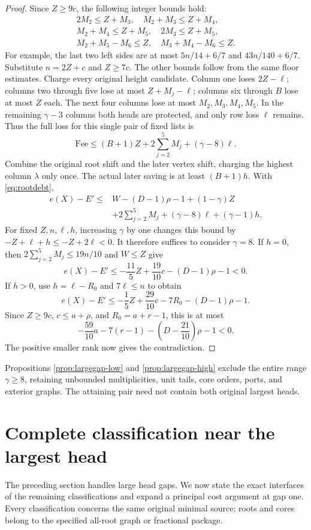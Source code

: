 \documentclass[11pt,a4paper]{article}
\theoremstyle{definition}
\begin{document}
\begin{proof}
Since $Z\ge9c$, the following integer bounds hold:
\[
\begin{gathered}
2M_2\le Z+M_3,\quad M_2+M_3\le Z+M_4,\\
M_2+M_4\le Z+M_5,\quad2M_3\le Z+M_5,\\
M_2+M_5-M_6\le Z,\quad M_3+M_4-M_6\le Z.
\end{gathered}
\]
For example, the last two left sides are at most $5n/14+6/7$ and $43n/140+6/7$. Substitute $n=2Z+c$ and $Z\ge7c$. The other bounds follow from the same floor estimates.
Charge every original height candidate. Column one loses $2Z-\ell$; columns two through five lose at most $Z+M_j-\ell$; columns six through $B$ lose at most $Z$ each. The next four columns lose at most $M_2,M_3,M_4,M_5$. In the remaining $\gamma-3$ columns both heads are protected, and only row loss $\ell$ remains. Thus the full loss for this single pair of fixed lists is
\[
\mathrm{Fee}\le(B+1)Z+2\sum_{j=2}^{5}M_j+(\gamma-8)\ell.
\]
Combine the original root shift and the later vertex shift, charging the highest column $\lambda$ only once. The actual later saving is at least $(B+1)h$. With \eqref{eq:rootdebt},
\[
\begin{split}
e(X)-E' \le{}& W-(D-1)\rho-1+(1-\gamma)Z\\
&+2\sum_{j=2}^{5}M_j+(\gamma-8)\ell+(\gamma-1)h.
\end{split}
\]
For fixed $Z,n,\ell,h$, increasing $\gamma$ by one changes this bound by
$-Z+\ell+h\le-Z+2\ell<0$. It therefore suffices to consider $\gamma=8$.
If $h=0$, then $2\sum_{j=2}^{5}M_j\le19n/10$ and $W\le Z$ give
\[
e(X)-E'\le-\frac{11}{5}Z+\frac{19}{10}c-(D-1)\rho-1<0.
\]
If $h>0$, use $h=\ell-R_0$ and $7\ell\le n$ to obtain
\[
e(X)-E'\le-\frac15Z+\frac{29}{10}c-7R_0-(D-1)\rho-1.
\]
Since $Z\ge9c$, $c\le a+\rho$, and $R_0=a+r-1$, this is at most
\[
-\frac{59}{10}a-7(r-1)-\left(D-\frac{21}{10}\right)\rho-1<0.
\]
The positive smaller rank now gives the contradiction.
\end{proof}

Propositions \ref{prop:largegap-low} and \ref{prop:largegap-high} exclude the entire range $\gamma\ge8$, retaining unbounded multiplicities, unit tails, core orders, ports, and exterior graphs. The attaining pair need not contain both original largest heads.


\section{Complete classification near the largest head}\label{sec:near-limit}
The preceding section handles large head gaps. We now state the exact interfaces of the remaining classifications and expand a principal cost argument at gap one. Every classification concerns the same original minimal source; roots and cores belong to the specified all-root graph or fractional package.
\end{document}
